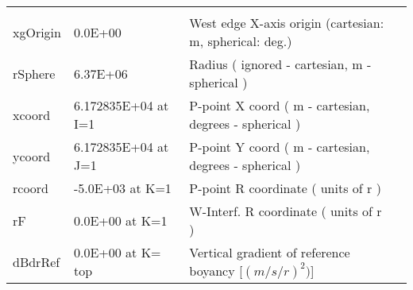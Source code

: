 \begin{table}
\begin{tabular}{lllc}
    &  %
    \\
   xgOrigin  &                   0.0E+00
    &   West edge X-axis origin (cartesian: m, spherical: deg.) 
    &  %
    \\
   rSphere   &                   6.37E+06
    &   Radius ( ignored - cartesian, m - spherical ) 
    &  %
    \\
   xcoord   &                   6.172835E+04 at I=1
    &   P-point X coord ( m - cartesian, degrees - spherical ) 
    &  %
    \\
   ycoord   &                   6.172835E+04 at J=1
    &   P-point Y coord ( m - cartesian, degrees - spherical ) 
    &  %
    \\
   rcoord   &                  -5.0E+03 at K=1
    &   P-point R coordinate (  units of r ) 
    &  %
    \\
   rF   &                   0.0E+00 at K=1
    &   W-Interf. R coordinate (  units of r ) 
    &  %
    \\
   dBdrRef   &      0.0E+00  at K= top
    &   Vertical gradient of reference boyancy [$(m/s/r)^2)$] 
    &  %
    \\
\end{tabular}
\end{table}

